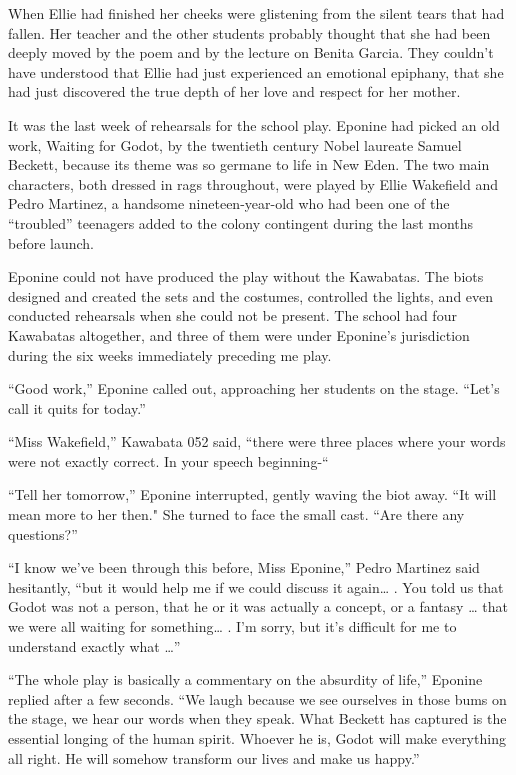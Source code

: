 \documentclass[]{article}
\begin{document}
{When Ellie had finished her cheeks were glistening from the silent tears that had fallen.  Her teacher and the other students probably thought that she had been deeply moved by the poem and by the lecture on Benita Garcia.  They couldn’t have understood that Ellie had just experienced an emotional epiphany, that she had just discovered the true depth of her love and respect for her mother.

It was the last week of rehearsals for the school play.  Eponine had picked an old work, Waiting for Godot, by the twentieth century Nobel laureate Samuel Beckett, because its theme was so germane to life in New Eden.  The two main characters, both dressed in rags throughout, were played by Ellie Wakefield and Pedro Martinez, a handsome nineteen-year-old who had been one of the “troubled” teenagers added to the colony contingent during the last months before launch.

Eponine could not have produced the play without the Kawabatas.  The biots designed and created the sets and the costumes, controlled the lights, and even conducted rehearsals when she could not be present.  The school had four Kawabatas altogether, and three of them were under Eponine’s jurisdiction during the six weeks immediately preceding me play.

“Good work,” Eponine called out, approaching her students on the stage.  “Let’s call it quits for today.”

“Miss Wakefield,” Kawabata 052 said, “there were three places where your words were not exactly correct.  In your speech beginning-“

“Tell her tomorrow,” Eponine interrupted, gently waving the biot away.  “It will mean more to her then."  She turned to face the small cast.  “Are there any questions?”

“I know we’ve been through this before, Miss Eponine,” Pedro Martinez said hesitantly, “but it would help me if we could discuss it again… .  You told us that Godot was not a person, that he or it was actually a concept, or a fantasy … that we were all waiting for something… .  I’m sorry, but it’s difficult for me to understand exactly what …”

“The whole play is basically a commentary on the absurdity of life,” Eponine replied after a few seconds.  “We laugh because we see ourselves in those bums on the stage, we hear our words when they speak.  What Beckett has captured is the essential longing of the human spirit.  Whoever he is, Godot will make everything all right.  He will somehow transform our lives and make us happy.”

}
\end{document}
